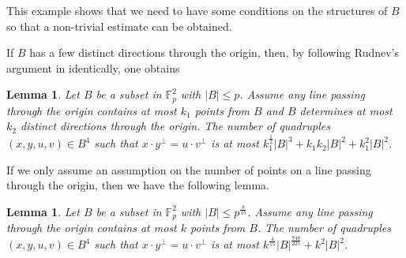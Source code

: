\documentclass[11pt]{article}
\newtheorem{lemma}[theorem]{Lemma}
\def\lv{\left\vert}
\def\rv{\right\vert}
\begin{document}
This example shows that we need to have some conditions on the structures of $B$ so that a non-trivial estimate can be obtained. 


If $B$ has a few distinct directions through the origin, then, by following  Rudnev's argument in \cite[Section 3]{R.14} identically, one obtains
\begin{lemma}\label{lem: 6.12}
Let $B$ be a subset in $\mathbb{F}_p^2$ with $|B|\le p$. Assume any line passing through the origin contains at most $k_1$ points from $B$ and $B$ determines at most $k_2$ distinct directions through the origin. The number of quadruples $(x, y, u, v)\in B^4$ such that $x\cdot y^\perp=u\cdot v^\perp$ is at most $k_1^{\frac{1}{2}}|B|^3+k_1k_2|B|^2+k_1^2|B|^2$.
\end{lemma}

If we only assume an assumption on the number of points on a line passing through the origin, then we have the following lemma.

\begin{lemma}\label{lem: 6.2}
Let $B$ be a subset in $\mathbb{F}_p^2$ with $|B|\le p^{\frac{8}{15}}$. Assume any line passing through the origin contains at most $k$ points from $B$. The number of quadruples $(x, y, u, v)\in B^4$ such that $x\cdot y^\perp=u\cdot v^\perp$ is at most $k^{\frac{4}{15}}|B|^{\frac{748}{225}}+ k^2 \lv B\rv^2$.
\end{lemma}
\end{document}
